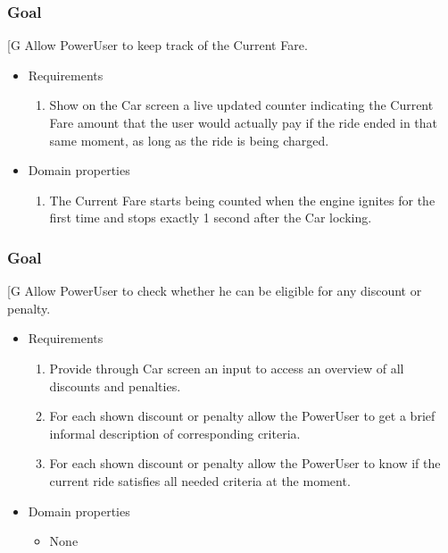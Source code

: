     \subsubsection{Goal }
    {[}G\arabic{goalctr}{]}
    Allow PowerUser to keep track of the Current Fare.
    \begin{itemize}
        \item Requirements
        \begin{enumerate}[REQ]
    			\item Show on the Car screen a live updated counter indicating the Current Fare amount that the user would actually pay if the ride ended in that same moment, as long as the ride is being charged.
        \end{enumerate}
        \item Domain properties
        \begin{enumerate}[PRO]
    			\item The Current Fare starts being counted when the engine ignites for the first time and stops exactly 1 second after the Car locking.
        \end{enumerate}
    \end{itemize}
    
    \subsubsection{Goal }
    {[}G\arabic{goalctr}{]}
    Allow PowerUser to check whether he can be eligible for any discount or penalty.
    \begin{itemize}
        \item Requirements
        \begin{enumerate}[REQ]
    			\item Provide through Car screen an input to access an overview of all discounts and penalties.
    			\item For each shown discount or penalty allow the PowerUser to get a brief informal description of corresponding criteria.
    			\item For each shown discount or penalty allow the PowerUser to know if the current ride satisfies all needed criteria at the moment.
        \end{enumerate}
        \item Domain properties
        \begin{itemize}
    			\item None
        \end{itemize}
    \end{itemize}
 
